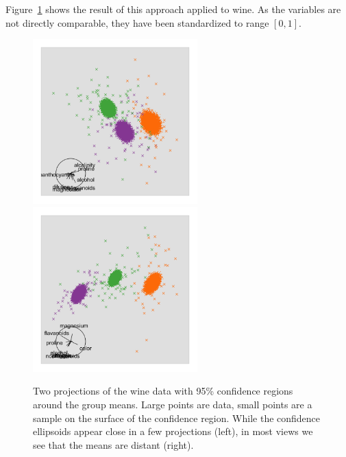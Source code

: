\documentclass[preprint]{imsart}
\begin{document}
Figure~\ref{fig:manova-wine} shows the result of this approach applied to wine. As the variables are not directly comparable, they have been standardized to range $[0, 1]$.



\begin{figure}[htbp]
  \centering
  \includegraphics[width=2.5in]{manova-1}
  \includegraphics[width=2.5in]{manova-2}
  \caption{Two projections of the wine data with 95\% confidence regions around the group means.  Large points are data, small points are a sample on the surface of the confidence region.  While the confidence ellipsoids appear close in a few projections (left), in most views we see that the means are distant (right).}
  \label{fig:manova-wine}
\end{figure}
\end{document}
